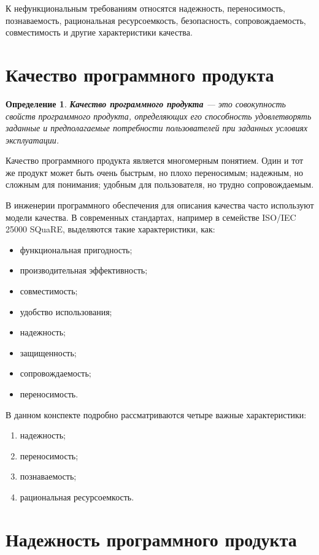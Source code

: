\documentclass[12pt,a4paper]{article}
\newtheorem{definition}{Определение}
\begin{document}
К нефункциональным требованиям относятся надежность, переносимость, познаваемость, рациональная ресурсоемкость, безопасность, сопровождаемость, совместимость и другие характеристики качества.

\section{Качество программного продукта}

\begin{definition}
\textbf{Качество программного продукта} --- это совокупность свойств программного продукта, определяющих его способность удовлетворять заданные и предполагаемые потребности пользователей при заданных условиях эксплуатации.
\end{definition}

Качество программного продукта является многомерным понятием. Один и тот же продукт может быть очень быстрым, но плохо переносимым; надежным, но сложным для понимания; удобным для пользователя, но трудно сопровождаемым.

В инженерии программного обеспечения для описания качества часто используют модели качества. В современных стандартах, например в семействе ISO/IEC 25000 SQuaRE, выделяются такие характеристики, как:
\begin{itemize}
    \item функциональная пригодность;
    \item производительная эффективность;
    \item совместимость;
    \item удобство использования;
    \item надежность;
    \item защищенность;
    \item сопровождаемость;
    \item переносимость.
\end{itemize}

В данном конспекте подробно рассматриваются четыре важные характеристики:
\begin{enumerate}
    \item надежность;
    \item переносимость;
    \item познаваемость;
    \item рациональная ресурсоемкость.
\end{enumerate}

\section{Надежность программного продукта}
\end{document}
